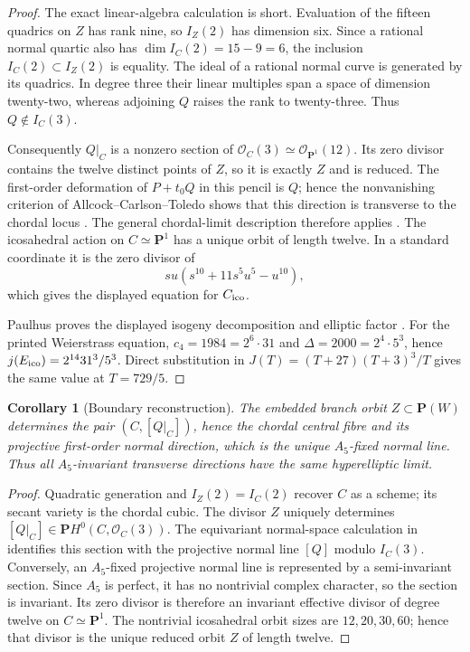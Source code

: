 \documentclass[11pt]{article}
\numberwithin{equation}{section}
\newtheorem{corollary}[theorem]{Corollary}
\theoremstyle{definition}
\theoremstyle{remark}
\newcommand{\PP}{\mathbf P}
\begin{document}
\begin{proof}
The exact linear-algebra calculation is short.  Evaluation of the fifteen
quadrics on \(Z\) has rank nine, so \(I_Z(2)\) has dimension six.  Since a
rational normal quartic also has \(\dim I_C(2)=15-9=6\), the inclusion
\(I_C(2)\subset I_Z(2)\) is equality.  The ideal of a rational normal curve
is generated by its quadrics.  In degree three their linear multiples span a
space of dimension twenty-two, whereas adjoining \(Q\) raises the rank to
twenty-three.  Thus \(Q\notin I_C(3)\).

Consequently \(Q|_C\) is a nonzero section of
\(\mathcal O_C(3)\simeq\mathcal O_{\PP^1}(12)\).  Its zero divisor contains
the twelve distinct points of \(Z\), so it is exactly \(Z\) and is reduced.
The first-order deformation of \(P+t_0Q\) in this pencil is \(Q\); hence the
nonvanishing criterion of Allcock--Carlson--Toledo shows that this direction
is transverse to the chordal locus \cite[Lemma~2.5]{ACT}.  The general
chordal-limit description therefore applies
\cite[Remark~1.8]{CMGHL}.  The icosahedral action on \(C\simeq\PP^1\) has a
unique orbit of length twelve.  In a standard coordinate it is the zero
divisor of
\[
 su(s^{10}+11s^5u^5-u^{10}),
\]
which gives the displayed equation for \(C_{\rm ico}\).

Paulhus proves the displayed isogeny decomposition and elliptic factor
\cite[Theorem~2]{Paulhus}.  For the printed Weierstrass equation,
\(c_4=1984=2^6\cdot31\) and \(\Delta=2000=2^4\cdot5^3\), hence
\(j(E_{\rm ico})=2^{14}31^3/5^3\).  Direct substitution in
\(J(T)=(T+27)(T+3)^3/T\) gives the same value at \(T=729/5\).
\end{proof}

\begin{corollary}[Boundary reconstruction]\label{cor:boundary-reconstruction}
The embedded branch orbit \(Z\subset\PP(W)\) determines the pair
\((C,[Q|_C])\), hence the chordal central fibre and its projective
first-order normal direction, which is the unique \(A_5\)-fixed normal line.
Thus all \(A_5\)-invariant transverse directions have the same hyperelliptic
limit.
\end{corollary}

\begin{proof}
Quadratic generation and \(I_Z(2)=I_C(2)\) recover \(C\) as a scheme; its
secant variety is the chordal cubic.  The divisor
\(Z\) uniquely determines \([Q|_C]\in\PP H^0(C,\mathcal O_C(3))\).
The equivariant normal-space calculation in
\cite[Lemma~2.5]{ACT} identifies this section with the
projective normal line \([Q]\) modulo \(I_C(3)\).  Conversely, an
\(A_5\)-fixed projective normal line is represented by a semi-invariant
section.  Since \(A_5\) is perfect, it has no nontrivial complex character,
so the section is invariant.  Its zero divisor is therefore an invariant
effective divisor of degree twelve on \(C\simeq\PP^1\).  The nontrivial
icosahedral orbit sizes are \(12,20,30,60\); hence that divisor is the unique
reduced orbit \(Z\) of length twelve.
\end{proof}
\end{document}
